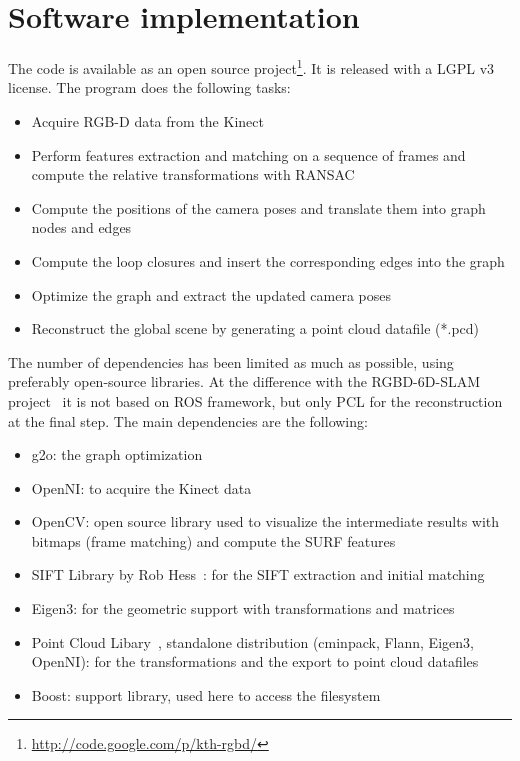 \clearpage
\section{Software implementation}

The code is available as an open source project\footnote{\url{http://code.google.com/p/kth-rgbd/}}. It is released with a LGPL v3 license.
The program does the following tasks:

\begin{itemize}
\item Acquire RGB-D data from the Kinect
\item Perform features extraction and matching on a sequence of frames and compute the relative transformations with \gls{RANSAC}
\item Compute the positions of the camera poses and translate them into graph nodes and edges
\item Compute the loop closures and insert the corresponding edges into the graph
\item Optimize the graph and extract the updated camera poses
\item Reconstruct the global scene by generating a point cloud datafile (*.pcd)
\end{itemize}

The number of dependencies has been limited as much as possible, using preferably open-source libraries. At the difference with the RGBD-6D-SLAM project~\cite{engelhard11euron-workshop} it is not based on \gls{ROS} framework, but only \gls{PCL} for the reconstruction at the final step. The main dependencies are the following:
\begin{itemize}
\item g2o: the graph optimization
\item OpenNI: to acquire the Kinect data
\item OpenCV: open source library used to visualize the intermediate results with bitmaps (frame matching) and compute the \gls {SURF} features
\item SIFT Library by Rob Hess~\cite{hess_sift}: for the \gls{SIFT} extraction and initial matching
\item Eigen3: for the geometric support with transformations and matrices
\item Point Cloud Libary~\cite{Rusu_ICRA2011_PCL}, standalone distribution (cminpack, Flann, Eigen3, OpenNI): for the transformations and the export to point cloud datafiles
\item Boost: support library, used here to access the filesystem
\end{itemize}

